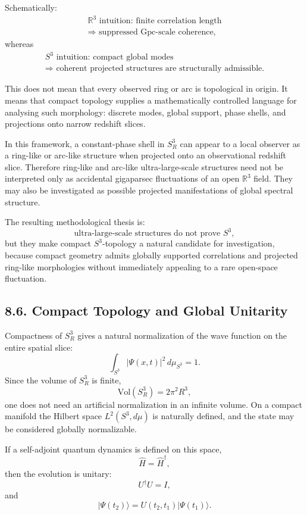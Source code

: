 \documentclass[12pt,a4paper]{article}
\theoremstyle{definition}
\begin{document}
Schematically:
\begin{multline*}
\mathbb{R}^3\text{ intuition: finite correlation length}\\
\Rightarrow
\text{ suppressed Gpc-scale coherence,}
\end{multline*}
whereas
\begin{multline*}
S^3\text{ intuition: compact global modes}\\
\Rightarrow
\text{ coherent projected structures are structurally admissible.}
\end{multline*}

This does not mean that every observed ring or arc is topological in origin. It means that compact topology supplies a mathematically controlled language for analysing such morphology: discrete modes, global support, phase shells, and projections onto narrow redshift slices.

In this framework, a constant-phase shell in \(S^3_R\) can appear to a local observer as a ring-like or arc-like structure when projected onto an observational redshift slice. Therefore ring-like and arc-like ultra-large-scale structures need not be interpreted only as accidental gigaparsec fluctuations of an open \(\mathbb R^3\) field. They may also be investigated as possible projected manifestations of global spectral structure.

The resulting methodological thesis is:
\[
\text{ultra-large-scale structures do not prove }S^3,
\]
but they make compact \(S^3\)-topology a natural candidate for investigation, because compact geometry admits globally supported correlations and projected ring-like morphologies without immediately appealing to a rare open-space fluctuation.

\subsection*{8.6. Compact Topology and Global Unitarity}

Compactness of \(S^3_R\) gives a natural normalization of the wave function on the entire spatial slice:
\[
\int_{S^3}|\Psi(x,t)|^2\,d\mu_{S^3}=1.
\]
Since the volume of \(S^3_R\) is finite,
\[
\mathrm{Vol}(S^3_R)=2\pi^2R^3,
\]
one does not need an artificial normalization in an infinite volume. On a compact manifold the Hilbert space \(L^2(S^3,d\mu)\) is naturally defined, and the state may be considered globally normalizable.

If a self-adjoint quantum dynamics is defined on this space,
\[
\widehat H=\widehat H^\dagger,
\]
then the evolution is unitary:
\[
U^\dagger U=I,
\]
and
\[
|\Psi(t_2)\rangle=U(t_2,t_1)|\Psi(t_1)\rangle.
\]
\end{document}
